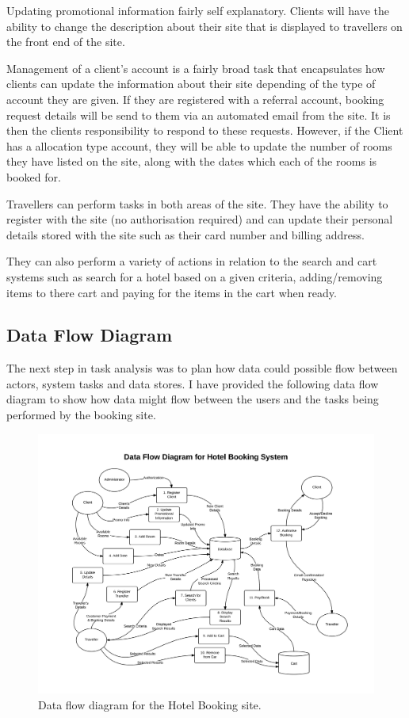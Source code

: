 \documentclass{article}
\begin{document}
Updating promotional information fairly self explanatory. Clients will have the ability to change the description about their site that is displayed to travellers on the front end of the site.

Management of a client's account is a fairly broad task that encapsulates how clients can update the information about their site depending of the type of account they are given. If they are registered with a referral account, booking request details will be send to them via an automated email from the site. It is then the clients responsibility to respond to these requests. However, if the Client has a allocation type account, they will be able to update the number of rooms they have listed on the site, along with the dates which each of the rooms is booked for.

Travellers can perform tasks in both areas of the site. They have the ability to register with the site (no authorisation required) and can update their personal details stored with the site such as their card number and billing address.

They can also perform a variety of actions in relation to the search and cart systems such as search for a hotel based on a given criteria, adding/removing items to there cart and paying for the items in the cart when ready.

\subsection{Data Flow Diagram}
The next step in task analysis was to plan how data could possible flow between  actors, system tasks and data stores. I have provided the following data flow diagram to show how data might flow between the users and the tasks being performed by the booking site.

\begin{landscape}
\begin{figure}[H]
\centering
\includegraphics[angle=0, width=1\textwidth]{img/dataflow.png}
\caption{Data flow diagram for the Hotel Booking site.}
\label{fig:data-flow}
\end{figure}
\end{landscape}
\end{document}
